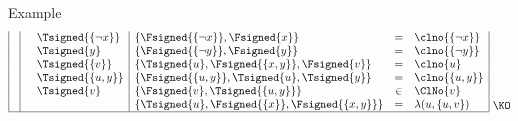 \begin{frame}[shrink=0]{Example}
\[\begin{array}[b]{|c|ll|lcl|}
                  &                             & \Tsigned{\{\neg x\}} & \{\Fsigned{\{\neg x\}},\Fsigned{x}\}              & =   & \clno{\{\neg x\}}
      \\
                  &                             & \Tsigned{y}          & \{\Fsigned{\{\neg y\}},\Fsigned{y}\}              & =   & \clno{\{\neg y\}}
      \\
                  &                             & \Tsigned{\{v\}}      & \{\Tsigned{u},\Fsigned{\{x,y\}},\Fsigned\{v\}\}   & =   & \clno{u}
      \\
                  &                             & \Tsigned{\{u,y\}}    & \{\Fsigned{\{u,y\}},\Tsigned{u},\Tsigned{y}\}     & =   & \clno{\{u,y\}}
      \\
                  &                             & \Tsigned{v}          & \{\Fsigned{v},\Tsigned{\{u,y\}}\}                 & \in & \ClNo{v}
      \\
                  &                             &                      & \{\Tsigned{u},\Fsigned{\{x\}},\Fsigned{\{x,y\}}\} & =   & \lambda(u,\{u,v\})
      \\\hline
    \end{array}
    ~\raisebox{1mm}{\KO}
  \]
\end{frame}
%
